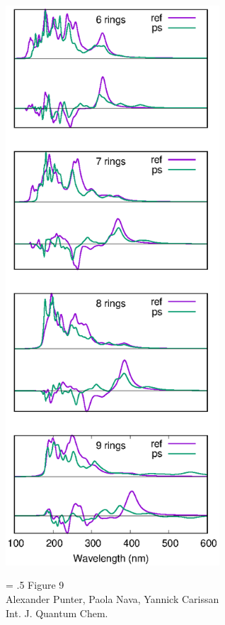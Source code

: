 \documentclass[12pt]{article}
\begin{document}
\begin{figure}

\begin{center}
\includegraphics[width=8cm]{helicene_uv_ecd}
\end{center}
{\Large
\begin{minipage}[t]{3in}
\baselineskip = .5\baselineskip
Figure 9 \\
Alexander Punter, Paola Nava, Yannick Carissan\\
Int. J. Quantum Chem.
\end{minipage}
}
\end{figure}

\clearpage
\end{document}
